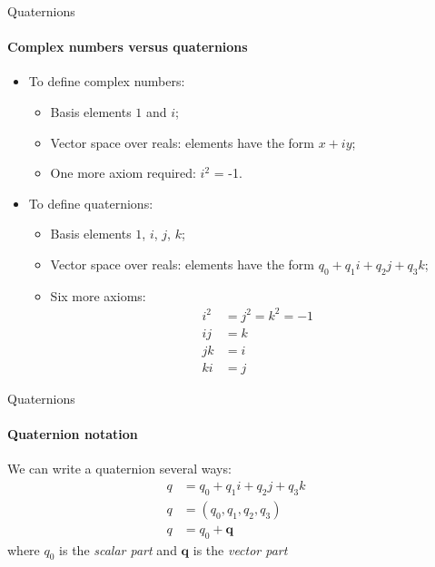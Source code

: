 \documentclass[aspectratio=169]{beamer}
\begin{document}
\begin{frame}{Quaternions}
	\framesubtitle{Complex numbers versus quaternions}

    \begin{itemize}
    \item To define complex numbers:
    \begin{itemize}
        \item Basis elements $1$ and $i$;
        \item Vector space over reals:  elements have the form $x+i y$;
        \item One more axiom required:  $i^2$ = -1.
    \end{itemize}
    \item To define quaternions:
    \begin{itemize}
        \item Basis elements $1$, $i$, $j$, $k$;
        \item Vector space over reals:  elements have the form $q_0 + q_1 i + q_2 j + q_3 k$;
        \item Six more axioms:
        \begin{align*}
        i^2 &= j^2 = k^2 = -1 \\
        ij &= k \\
        jk &= i \\
        ki &= j
        \end{align*}
    \end{itemize}
\end{itemize}
\end{frame}

\begin{frame}{Quaternions}
	\framesubtitle{Quaternion notation}

    We can write a quaternion several ways:
    \begin{align*}
        q &= q_0 + q_1 i + q_2 j + q_3 k\\
        q &= (q_0, q_1, q_2, q_3)\\
        q &= q_0 + \mathbf{q}
    \end{align*}
    where $q_0$ is the \emph{scalar part} and $\mathbf{q}$ is the \emph{vector part}
\end{frame}
\end{document}
